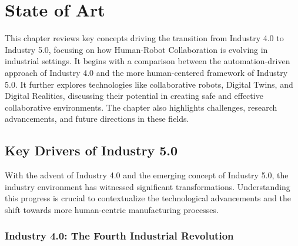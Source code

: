 \chapter{State of Art}
\label{chapter:stateofart}

\begin{introduction}
    This chapter reviews key concepts driving the transition from Industry 4.0 to Industry 5.0, focusing on how Human-Robot Collaboration is evolving in industrial settings. It begins with a comparison between the automation-driven approach of Industry 4.0 and the more human-centered framework of Industry 5.0. It further explores technologies like collaborative robots, Digital Twins, and Digital Realities, discussing their potential in creating safe and effective collaborative environments. The chapter also highlights challenges, research advancements, and future directions in these fields.
\end{introduction}



\section{Key Drivers of Industry 5.0}
\label{section:industry-evolution}
With the advent of Industry 4.0 and the emerging concept of Industry 5.0, the industry environment has witnessed significant transformations. Understanding this progress is crucial to contextualize the technological advancements and the shift towards more human-centric manufacturing processes.

\subsection{Industry 4.0: The Fourth Industrial Revolution}

